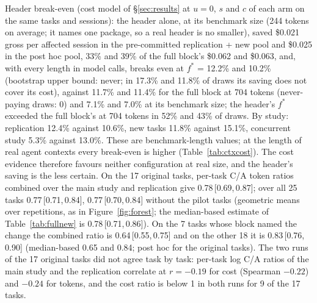 \documentclass[11pt]{article}
\newcommand{\ci}[2]{\,[#1,\,#2]}
\begin{document}
Header break-even (cost model of \S\ref{sec:results} at $u = 0$, $s$ and $c$ of each arm on the same tasks and sessions): the header alone, at its benchmark size (244 tokens on average; it names one package, so a real header is no smaller), saved \$0.021 gross per affected session in the pre-committed replication + new pool and \$0.025 in the post hoc pool, 33\% and 39\% of the full block's \$0.062 and \$0.063, and, with every length in model calls, breaks even at $f^{*}$ = 12.2\% and 10.2\% (bootstrap upper bound: never; in 17.3\% and 11.8\% of draws its saving does not cover its cost), against 11.7\% and 11.4\% for the full block at 704 tokens (never-paying draws: 0) and 7.1\% and 7.0\% at its benchmark size; the header's $f^{*}$ exceeded the full block's at 704 tokens in 52\% and 43\% of draws. By study: replication 12.4\% against 10.6\%, new tasks 11.8\% against 15.1\%, concurrent study 5.3\% against 13.0\%. These are benchmark-length values; at the length of real agent contexts every break-even is higher (Table~\ref{tab:ctxcost}). The cost evidence therefore favours neither configuration at real size, and the header's saving is the less certain.
On the 17 original tasks, per-task C/A token ratios combined over the main study and replication give 0.78\ci{0.69}{0.87}; over all 25 tasks 0.77\ci{0.71}{0.84}, 0.77\ci{0.70}{0.84} without the pilot tasks (geometric means over repetitions, as in Figure~\ref{fig:forest}; the median-based estimate of Table~\ref{tab:fullnew} is 0.78\ci{0.71}{0.86}). On the 7 tasks whose block named the change the combined ratio is 0.64\ci{0.55}{0.75} and on the other 18 it is 0.83\ci{0.76}{0.90} (median-based 0.65 and 0.84; post hoc for the original tasks).
The two runs of the 17 original tasks did not agree task by task: per-task log C/A ratios of the main study and the replication correlate at $r = -0.19$ for cost (Spearman $-0.22$) and $-0.24$ for tokens, and the cost ratio is below 1 in both runs for 9 of the 17 tasks.
\end{document}
